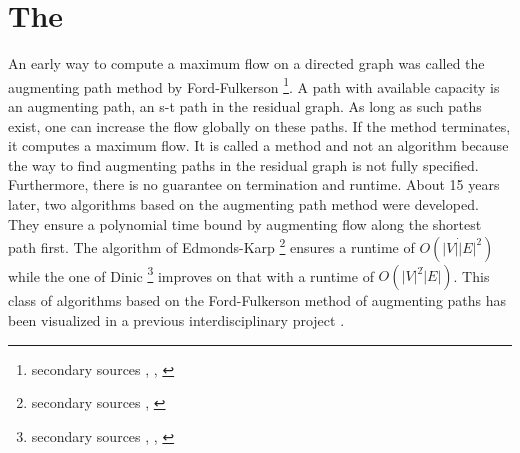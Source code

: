 \section{The \pushRelabel{}}
An early way to compute a maximum flow on a directed graph was called the augmenting path method by Ford-Fulkerson \cite{ford1956maximal}\footnote{secondary sources \cite[sec. 6.4]{ahuja1993network}, \cite[sec. 26.2, p.724]{cormen2009introduction}, \cite[sec. 6.1]{jungnickel2013graphs}}. A path with available capacity is an augmenting path, an s-t path in the residual graph. As long as such paths exist, one can increase the flow globally on these paths. If the method terminates, it computes a maximum flow. It is called a method and not an algorithm because the way to find augmenting paths in the residual graph is not fully specified. Furthermore, there is no guarantee on termination and runtime. About 15 years later, two algorithms based on the augmenting path method were developed. They ensure a polynomial time bound by augmenting flow along the shortest path first. The algorithm of Edmonds-Karp \cite{edmonds1972theoretical}\footnote{secondary sources \cite[sec. 26.2, p. 727]{cormen2009introduction}, \cite[sec. 6.2]{jungnickel2013graphs}} ensures a runtime of $O(|V|\dot|E|^2)$ while the one of Dinic \cite{dinic1970algorithm}\footnote{secondary sources \cite[sec. 7.4]{ahuja1993network}, \cite[sec. 26.2]{cormen2009introduction}, \cite[sec. 6.4]{jungnickel2013graphs}} improves on that with a runtime of $O(|V|^2\dot|E|)$. This class of algorithms based on the Ford-Fulkerson method of augmenting paths has been visualized in a previous interdisciplinary project \cite{fischer2016idp}.

